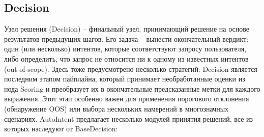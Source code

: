 \documentclass[14pt,a4paper,oneside,openany]{extbook}
\begin{document}
\subsection{Decision}
\label{sec:orgf904924}
Узел решения (Decision) – финальный узел, принимающий решение на основе результатов предыдущих шагов. Его задача – вынести окончательный вердикт: один (или несколько) интентов, которые соответствуют запросу пользователя, либо определить, что запрос не относится ни к одному из известных интентов (out-of-scope). Здесь тоже предусмотрено несколько стратегий: Decision является последним этапом пайплайна, который принимает необработанные оценки из нода Scoring и преобразует их в окончательные предсказанные метки для каждого выражения. Этот этап особенно важен для применения порогового отклонения (обнаружение OOS) или выбора нескольких намерений в многозначных сценариях. AutoIntent предлагает несколько модулей принятия решений, все из которых наследуют от BaseDecision:
\end{document}
